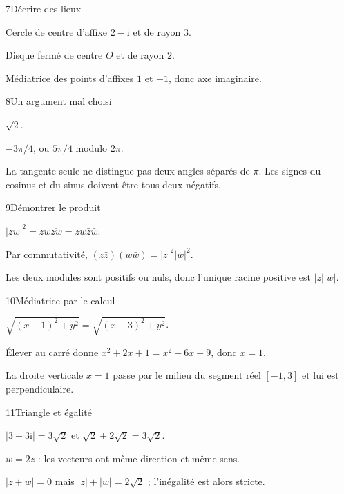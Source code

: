 \begin{corrige}{7}{Décrire des lieux}
\begin{questions}
\item Cercle de centre d’affixe $2-\mathrm i$ et de rayon $3$.
\item Disque fermé de centre $O$ et de rayon $2$.
\item Médiatrice des points d’affixes $1$ et $-1$, donc axe imaginaire.
\end{questions}
\end{corrige}
\begin{corrige}{8}{Un argument mal choisi}
\begin{questions}
\item $\sqrt2$.
\item $-3\pi/4$, ou $5\pi/4$ modulo $2\pi$.
\item La tangente seule ne distingue pas deux angles séparés de $\pi$. Les signes du cosinus et du sinus doivent être tous deux négatifs.
\end{questions}
\end{corrige}
\begin{corrige}{9}{Démontrer le produit}
\begin{questions}
\item $|zw|^2=zw\overline{zw}=zw\bar z\bar w$.
\item Par commutativité, $(z\bar z)(w\bar w)=|z|^2|w|^2$.
\item Les deux modules sont positifs ou nuls, donc l’unique racine positive est $|z||w|$.
\end{questions}
\end{corrige}
\begin{corrige}{10}{Médiatrice par le calcul}
\begin{questions}
\item $\sqrt{(x+1)^2+y^2}=\sqrt{(x-3)^2+y^2}$.
\item Élever au carré donne $x^2+2x+1=x^2-6x+9$, donc $x=1$.
\item La droite verticale $x=1$ passe par le milieu du segment réel $[-1,3]$ et lui est perpendiculaire.
\end{questions}
\end{corrige}
\begin{corrige}{11}{Triangle et égalité}
\begin{questions}
\item $|3+3\mathrm i|=3\sqrt2$ et $\sqrt2+2\sqrt2=3\sqrt2$.
\item $w=2z$ : les vecteurs ont même direction et même sens.
\item $|z+w|=0$ mais $|z|+|w|=2\sqrt2$ ; l’inégalité est alors stricte.
\end{questions}
\end{corrige}
